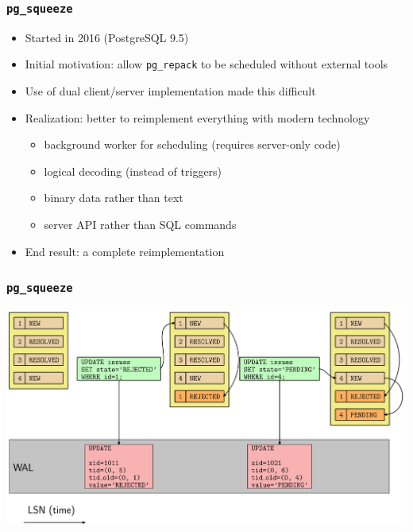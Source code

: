 \begin{frame}
  \frametitle{\texttt{pg\_squeeze}}
  \begin{itemize}
    \item Started in 2016 (PostgreSQL 9.5)
    \item Initial motivation: allow \texttt{pg\_repack} to be scheduled without external tools
    \item Use of dual client/server implementation made this difficult
    \item Realization: better to reimplement everything with modern technology
      \begin{itemize}
	\item background worker for scheduling (requires server-only code)
	\item logical decoding (instead of triggers)
        \item binary data rather than text
        \item server API rather than SQL commands
      \end{itemize}
    \item End result: a complete reimplementation
  \end{itemize}
\end{frame}

\begin{frame}
  \frametitle{\texttt{pg\_squeeze}}
  \begin{center}
    \includegraphics[height=\sizeforimages\textheight]{images/pg_squeeze_01.png}
  \end{center}
\end{frame}

